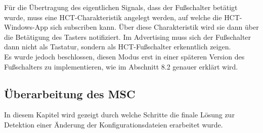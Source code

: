 Für die Übertragung des eigentlichen Signals, dass der Fußschalter betätigt wurde, muss eine \ac{HCT}-Charakteristik angelegt werden, auf welche die \ac{HCT}-Windows-App sich subscriben kann. Über diese Charakteristik wird sie dann über die Betätigung des Tasters notifiziert. Im Advertising muss sich der Fußschalter dann nicht als Tastatur, sondern als \ac{HCT}-Fußschalter erkenntlich zeigen.\\
Es wurde jedoch beschlossen, diesen Modus erst in einer späteren Version des Fußschalters zu implementieren, wie im Abschnitt 8.2 genauer erklärt wird.

\subsection{Überarbeitung des MSC}
\label{UberarbeitungMSC}
In diesem Kapitel wird gezeigt durch welche Schritte die finale Lösung zur Detektion einer Änderung der Konfigurationsdateien erarbeitet wurde.

